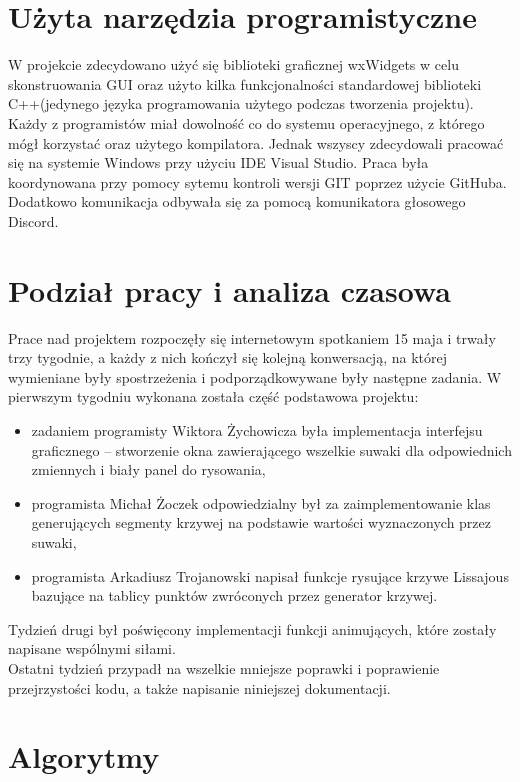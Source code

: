 \section{Użyta narzędzia programistyczne}
W projekcie zdecydowano użyć się biblioteki graficznej wxWidgets w celu skonstruowania GUI oraz użyto kilka funkcjonalności standardowej biblioteki C++(jedynego języka programowania użytego podczas tworzenia projektu). Każdy z programistów miał dowolność co do systemu operacyjnego, z którego mógł korzystać oraz użytego kompilatora. Jednak wszyscy zdecydowali pracować się na systemie Windows przy użyciu IDE Visual Studio. Praca była koordynowana przy pomocy sytemu kontroli wersji GIT poprzez użycie GitHuba. Dodatkowo komunikacja odbywała się za pomocą komunikatora głosowego Discord. 
\section{Podział pracy i analiza czasowa}
Prace nad projektem rozpoczęły się internetowym spotkaniem 15 maja i trwały trzy tygodnie, a każdy z nich kończył się kolejną konwersacją, na której wymieniane były spostrzeżenia i podporządkowywane były następne zadania. W pierwszym tygodniu wykonana została część podstawowa projektu:
\begin{itemize}
	\item zadaniem programisty Wiktora Żychowicza była implementacja interfejsu graficznego – stworzenie okna zawierającego wszelkie suwaki dla odpowiednich zmiennych i biały panel do rysowania,
	\item programista Michał Żoczek odpowiedzialny był za zaimplementowanie klas generujących segmenty krzywej na podstawie wartości wyznaczonych przez suwaki,
	\item	programista Arkadiusz Trojanowski napisał funkcje rysujące krzywe Lissajous bazujące na tablicy punktów zwróconych przez generator krzywej.
\end{itemize}

Tydzień drugi był poświęcony implementacji funkcji animujących, które zostały napisane wspólnymi siłami.\\
Ostatni tydzień przypadł na wszelkie mniejsze poprawki i poprawienie przejrzystości kodu, a także napisanie niniejszej dokumentacji.

	\section{Algorytmy}
